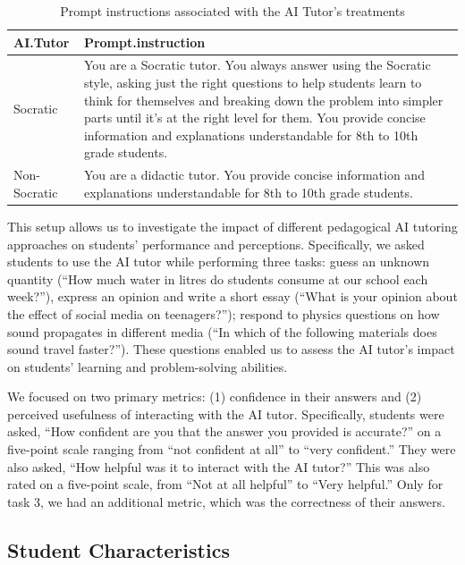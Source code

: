 \documentclass[
  11pt,
]{article}
\begin{document}
\begin{table}

\caption{\label{tab:prompts}Prompt instructions associated with the AI Tutor's treatments}
\centering
\begin{tabular}[t]{l>{\raggedright\arraybackslash}p{4in}}
\toprule
AI.Tutor & Prompt.instruction\\
\midrule
Socratic & You are a Socratic tutor. You always answer using the Socratic style, asking just the right questions to help students learn to think for themselves and breaking down the problem into simpler parts until it's at the right level for them. You provide concise information and explanations understandable for 8th to 10th grade students.\\
Non-Socratic & You are a didactic tutor. You provide concise information and explanations understandable for 8th to 10th grade students.\\
\bottomrule
\end{tabular}
\end{table}

This setup allows us to investigate the impact of different pedagogical AI tutoring approaches on students' performance and perceptions. Specifically, we asked students to use the AI tutor while performing three tasks: guess an unknown quantity (``How much water in litres do students consume at our school each week?''), express an opinion and write a short essay (``What is your opinion about the effect of social media on teenagers?''); respond to physics questions on how sound propagates in different media (``In which of the following materials does sound travel faster?''). These questions enabled us to assess the AI tutor's impact on students' learning and problem-solving abilities.

We focused on two primary metrics: (1) confidence in their answers and (2) perceived usefulness of interacting with the AI tutor. Specifically, students were asked, ``How confident are you that the answer you provided is accurate?'' on a five-point scale ranging from ``not confident at all'' to ``very confident.'' They were also asked, ``How helpful was it to interact with the AI tutor?'' This was also rated on a five-point scale, from ``Not at all helpful'' to ``Very helpful.'' Only for task 3, we had an additional metric, which was the correctness of their answers.

\subsection{Student Characteristics}\label{student-characteristics}
\end{document}
